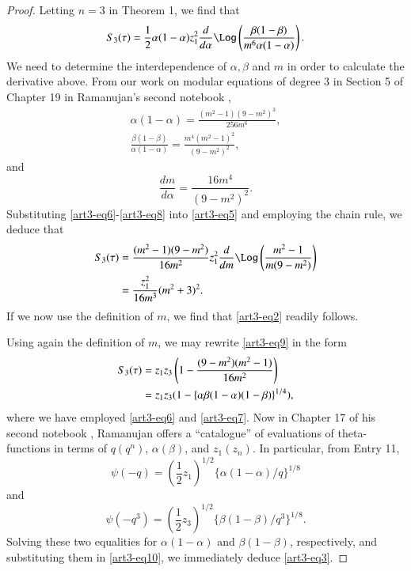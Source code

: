 \begin{proof}
Letting $n=3$ in Theorem 1, we find that
\begin{equation}
S_3 (\tau) = \frac{1}{2} \alpha (1-\alpha) z^2_1 \frac{d}{d\alpha} \Log \left(\frac{\beta(1-\beta)}{m^6 \alpha (1-\alpha)} \right).
\label{art3-eq5}
\end{equation}
We need to determine the interdependence of $\alpha, \beta$ and $m$ in order to calculate the derivative above. From our work \cite{art3-key2} on modular equations of degree 3 in Section 5 of Chapter 19 in Ramanujan's second notebook \cite{art3-key9},
\begin{gather}
\alpha (1-\alpha) = \frac{(m^2 -1)(9-m^2)^3}{256m^6},\label{art3-eq6}\\
\frac{\beta(1-\beta)}{\alpha (1-\alpha)} = \frac{m^4 (m^2-1)^2}{(9-m^2)^2},\label{art3-eq7}
\end{gather}\pageoriginale
and 
\begin{equation}
\frac{dm}{d\alpha} = \frac{16m^4}{(9-m^2)^2} .\label{art3-eq8}
\end{equation}
Substituting \eqref{art3-eq6}-\eqref{art3-eq8} into \eqref{art3-eq5} and employing the chain rule, we deduce that 
\begin{align}
S_3 (\tau) & = \frac{(m^2-1) (9-m^2)}{16m^2} z^2_1 \frac{d}{dm} \Log \left(\frac{m^2 -1}{m(9-m^2)} \right)\label{art3-eq9}\\
& = \frac{z^2_1}{16m^3} (m^2+3)^2. \notag
\end{align}
If we now use the definition of $m$, we find that \eqref{art3-eq2} readily follows.

Using again the definition of $m$, we may rewrite \eqref{art3-eq9} in the form
\begin{align}
S_3 (\tau) & = z_1 z_3 \left(1- \frac{(9-m^2) (m^2-1)}{16m^2} \right) \label{art3-eq10}\\
& = z_1 z_3 (1-\{\alpha \beta (1-\alpha) (1-\beta)\}^{1/4}), \notag
\end{align}
where we have employed \eqref{art3-eq6} and \eqref{art3-eq7}. Now in Chapter 17 of his second notebook \cite{art3-key9}, Ramanujan offers a ``catalogue'' of evaluations of theta-functions in terms of $q(q^n)$, $\alpha (\beta)$, and $z_1 (z_n)$. In particular, from Entry 11, 
$$
\psi (-q)  = (\frac{1}{2} z_1)^{1/2} \{\alpha (1-\alpha) / q\}^{1/8}
$$
and 
$$
\psi (-q^3) = (\frac{1}{2}z_3)^{1/2} \{\beta (1-\beta) /q^3\}^{1/8}.
$$
Solving these two equalities for $\alpha (1-\alpha)$ and $\beta (1-\beta)$, respectively, and substituting them in \eqref{art3-eq10}, we immediately deduce \eqref{art3-eq3}.


\end{proof}
